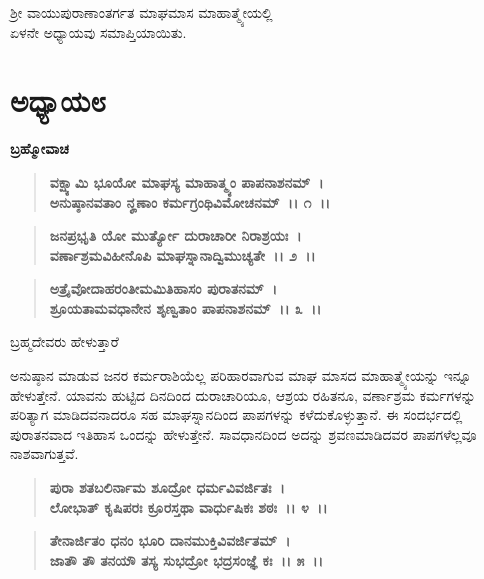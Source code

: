 \begin{center}
ಶ‍್ರೀ ವಾಯುಪುರಾಣಾಂತರ್ಗತ ಮಾಘಮಾಸ ಮಾಹಾತ್ಮ್ಯೇಯಲ್ಲಿ \\ ಏಳನೇ ಅಧ್ಯಾಯವು ಸಮಾಪ್ತಿಯಾಯಿತು.
\end{center}

\newpage

\section*{ಅಧ್ಯಾಯ\enginline{-}೮}

\begin{flushleft}
\textbf{ಬ್ರಹ್ಮೋವಾಚ\enginline{-} }
\end{flushleft}

\begin{verse}
\textbf{ವಕ್ಷ್ಯಾಮಿ ಭೂಯೋ ಮಾಘಸ್ಯ ಮಾಹಾತ್ಮ್ಯಂ ಪಾಪನಾಶನಮ್~।}\\\textbf{ಅನುಷ್ಠಾನವತಾಂ ನೄಣಾಂ ಕರ್ಮಗ್ರಂಥಿವಿಮೋಚನಮ್~।। ೧~।। }
\end{verse}

\begin{verse}
\textbf{ಜನಪ್ರಭೃತಿ ಯೋ ಮುರ್ತ್ಯೋ ದುರಾಚಾರೀ ನಿರಾಶ್ರಯಃ~।}\\\textbf{ವರ್ಣಾಶ್ರಮವಿಹೀನೊಪಿ ಮಾಘಸ್ನಾನಾದ್ವಿಮುಚ್ಯತೇ~।। ೨~।।}
\end{verse}

\begin{verse}
\textbf{ಅತ್ರೈವೋದಾಹರಂತೀಮಮಿತಿಹಾಸಂ ಪುರಾತನಮ್~।}\\\textbf{ಶ್ರೂಯತಾಮವಧಾನೇನ ಶೃಣ್ವತಾಂ ಪಾಪನಾಶನಮ್~।। ೩~।। }
\end{verse}

\begin{flushleft}
ಬ್ರಹ್ಮದೇವರು ಹೇಳುತ್ತಾರೆ
\end{flushleft}

ಅನುಷ್ಠಾನ ಮಾಡುವ ಜನರ ಕರ್ಮರಾಶಿಯೆಲ್ಲ ಪರಿಹಾರವಾಗುವ ಮಾಘ ಮಾಸದ ಮಾಹಾತ್ಮ್ಯೇಯನ್ನು ಇನ್ನೂ ಹೇಳುತ್ತೇನೆ. ಯಾವನು ಹುಟ್ಟಿದ ದಿನದಿಂದ ದುರಾಚಾರಿಯೂ, ಆಶ್ರಯ ರಹಿತನೂ, ವರ್ಣಾಶ್ರಮ ಕರ್ಮಗಳನ್ನು ಪರಿತ್ಯಾಗ ಮಾಡಿದವನಾದರೂ ಸಹ ಮಾಘಸ್ನಾನದಿಂದ ಪಾಪಗಳನ್ನು ಕಳೆದುಕೊಳ್ಳುತ್ತಾನೆ. ಈ ಸಂದರ್ಭದಲ್ಲಿ ಪುರಾತನವಾದ ಇತಿಹಾಸ ಒಂದನ್ನು ಹೇಳುತ್ತೇನೆ. ಸಾವಧಾನದಿಂದ ಅದನ್ನು ಶ್ರವಣಮಾಡಿದವರ ಪಾಪಗಳೆಲ್ಲವೂ ನಾಶವಾಗುತ್ತವೆ.

\begin{verse}
\textbf{ಪುರಾ ಶತಬಲಿರ್ನಾಮ ಶೂದ್ರೋ ಧರ್ಮವಿವರ್ಜಿತಃ~।}\\\textbf{ಲೋಭಾತ್ ಕೃಷಿಪರಃ ಕ್ರೂರಸ್ತಥಾ ವಾರ್ಧುಷಿಕಃ ಶಠಃ~।। ೪~।। }
\end{verse}

\begin{verse}
\textbf{ತೇನಾರ್ಜಿತಂ ಧನಂ ಭೂರಿ ದಾನಮುಕ್ತಿವಿವರ್ಜಿತಮ್~।}\\\textbf{ಜಾತೌ ತೌ ತನಯೌ ತಸ್ಯ ಸುಭದ್ರೋ ಭದ್ರಸಂಜ್ಞೆ ಕಃ~।। ೫~।।}
\end{verse}


